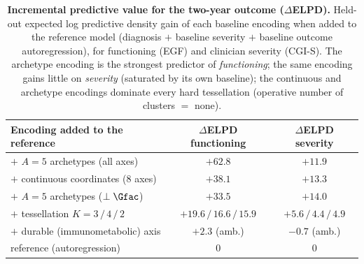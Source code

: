 \begin{table}[t]
\centering
\caption{\textbf{Incremental predictive value for the two-year outcome ($\Delta$ELPD).}
Held-out expected log predictive density gain of each baseline encoding when added to the
reference model (diagnosis $+$ baseline severity $+$ baseline outcome autoregression), for
functioning (EGF) and clinician severity (CGI-S). The archetype encoding is the strongest
predictor of \emph{functioning}; the same encoding gains little on \emph{severity} (saturated
by its own baseline); the continuous and archetype encodings dominate every hard tessellation
(operative number of clusters $=$ none).}
\label{tab:incremental}
\small
\renewcommand{\arraystretch}{1.15}
\begin{tabular}{@{}l c c@{}}
\toprule
Encoding added to the reference & $\Delta$ELPD functioning & $\Delta$ELPD severity \\
\midrule
$+$ $A{=}5$ archetypes (all axes)        & $\mathbf{+62.8}$ & $+11.9$ \\
$+$ continuous coordinates (8 axes)      & $+38.1$ & $+13.3$ \\
$+$ $A{=}5$ archetypes ($\perp\Gfac$)    & $+33.5$ & $+14.0$ \\
$+$ tessellation $K=3\,/\,4\,/\,2$       & $+19.6\,/\,16.6\,/\,15.9$ & $+5.6\,/\,4.4\,/\,4.9$ \\
$+$ durable (immunometabolic) axis       & $+2.3$ (amb.) & $-0.7$ (amb.) \\
reference (autoregression)               & $0$ & $0$ \\
\bottomrule
\end{tabular}
\end{table}

